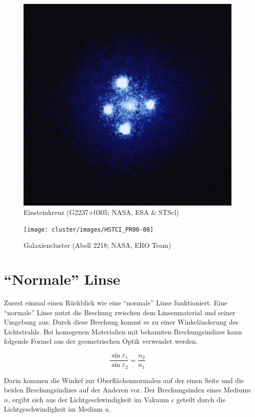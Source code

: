 \begin{refsection}
\begin{figure}
  \centering
  \includegraphics[width=.7\textwidth]{cluster/images/Einstein_cross}
  \caption{Einsteinkreuz (G2237+0305; NASA, ESA \& STScl)
    \cite{wiki:einsteinkreuz}}
  \label{fig:einsteinkreuz}
\end{figure}

\begin{figure}
  \centering
  \texttt{[image: cluster/images/HSTCI\_PR00-08]}
  \caption{Galaxiencluster (Abell 2218; NASA, ERO Team)
    \cite{wiki:abell}}
  \label{fig:abell}
\end{figure}

\section{``Normale'' Linse}
Zuerst einmal einen Rückblick wie eine ``normale'' Linse funktioniert.
Eine ``normale'' Linse nutzt die Brechung zwischen dem Linsenmaterial
und seiner Umgebung aus.  Durch diese Brechung kommt es zu einer
Winkeländerung des Lichtstrahls.  Bei homogenen Materialien mit
bekannten Brechungsindizes kann folgende Formel aus der geometrischen
Optik verwendet werden.

\begin{equation}
  \frac{\sin \varepsilon_1}{\sin \varepsilon_2} = \frac{n_2}{n_1}
\end{equation}

Darin kommen die Winkel zur Oberflächennormalen auf der einen Seite
und die beiden Brechungsindizes auf der Anderen vor.  Der
Brechungsindex eines Mediums \(n\), ergibt sich aus der
Lichtgeschwindigkeit im Vakuum \(c\) geteilt durch die
Lichtgeschwindigkeit im Medium \(u\).


\end{refsection}
